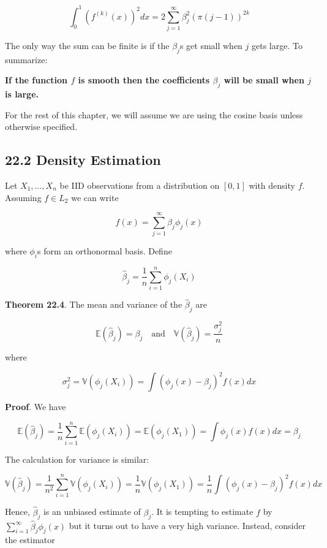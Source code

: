 \[ \int_{0}^{1} (f^{(k)}(x))^{2} dx = 2 \sum_{j=1}^{\infty} \beta_{j}^{2} ( \pi (j - 1) ) ^{2k} \]

The only way the sum can be finite is if the \(\beta_{j}\)s get small
when \(j\) gets large. To summarize:

\textbf{If the function \(f\) is smooth then the coefficients
\(\beta_{j}\) will be small when \(j\) is large.}

For the rest of this chapter, we will assume we are using the cosine
basis unless otherwise specified.

\subsection*{22.2 Density Estimation}\label{density-estimation}

Let \(X_{1}, \dots, X_{n}\) be IID observations from a distribution on
\([0, 1]\) with density \(f\). Assuming \(f \in L_{2}\) we can write

\[ f(x) = \sum_{j=1}^{\infty} \beta_{j} \phi_{j}(x) \]

where \(\phi_{i}\)s form an orthonormal basis. Define

\[ \hat{\beta}_{j} = \frac{1}{n} \sum_{i=1}^{n} \phi_{j}(X_{i})\]

\textbf{Theorem 22.4}. The mean and variance of the \(\hat{\beta}_{j}\)
are

\[
\mathbb{E}(\hat{\beta}_{j}) = \beta_{j}
\quad \text{and} \quad
\mathbb{V}(\hat{\beta}_{j}) = \frac{\sigma_{j}^{2}}{n}
\]

where

\[ \sigma_{j}^{2} = \mathbb{V}(\phi_{j}(X_{i})) = \int \left( \phi_{j}(x) - \beta_{j}\right)^{2}f(x) dx\]

\textbf{Proof}. We have

\[ \mathbb{E}(\hat{\beta}_{j}) = \frac{1}{n} \sum_{i=1}^{n} \mathbb{E}(\phi_{j}(X_{i})) = \mathbb{E}(\phi_{j}(X_{1}))  = \int \phi_{j}(x) f(x) dx = \beta_{j}\]

The calculation for variance is similar:

\[ \mathbb{V}(\hat{\beta}_{j}) = \frac{1}{n^{2}} \sum_{i=1}^{n} \mathbb{V}(\phi_{j}(X_{i})) = \frac{1}{n} \mathbb{V}(\phi_{j}(X_{1})) = \frac{1}{n} \int \left( \phi_{j}(x) - \beta_{j}\right)^{2}f(x) dx \]

Hence, \(\hat{\beta}_{j}\) is an unbiased estimate of \(\beta_{j}\). It is
tempting to estimate \(f\) by
\(\sum_{i=1}^{\infty} \hat{\beta}_{j} \phi_{j}(x)\) but it turns out to have a
very high variance. Instead, consider the estimator

